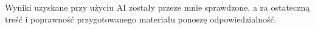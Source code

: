 Wyniki uzyskane przy użyciu AI zostały przeze mnie sprawdzone, a za ostateczną
treść i poprawność przygotowanego materiału ponoszę odpowiedzialność.


%
